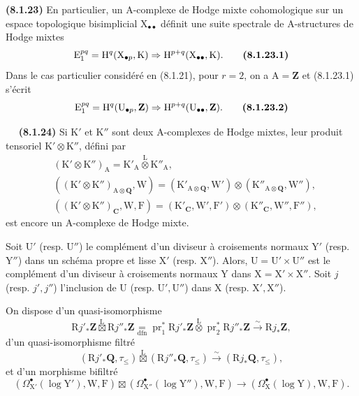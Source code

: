 \documentclass[11pt,leqno]{article}
\newcommand{\Page}[1]{\ifvmode\noindent\else\unskip\ \fi{\footnotesize\textcolor{gray}{[p.\,#1]}}\ \ignorespaces}
\begin{document}
\textbf{(8.1.23)} En particulier, un \(\mathrm{A}\)-complexe de Hodge mixte cohomologique sur un espace topologique bisimplicial \(\mathrm{X}_{\bullet\bullet}\) définit une suite spectrale de \(\mathrm{A}\)-structures de Hodge mixtes
\[
\mathrm{E}_{1}^{pq}
=
\mathrm{H}^{q}(\mathrm{X}_{\bullet p},\mathrm{K})
\Rightarrow
\mathrm{H}^{p+q}(\mathrm{X}_{\bullet\bullet},\mathrm{K}).
\tag*{\textbf{(8.1.23.1)}}
\]
Dans le cas particulier considéré en (8.1.21), pour \(r=2\), on a \(\mathrm{A}=\mathbf{Z}\) et (8.1.23.1) s’écrit
\[
\mathrm{E}_{1}^{pq}
=
\mathrm{H}^{q}(\mathrm{U}_{\bullet p},\mathbf{Z})
\Rightarrow
\mathrm{H}^{p+q}(\mathrm{U}_{\bullet\bullet},\mathbf{Z}).
\tag*{\textbf{(8.1.23.2)}}
\]

\Page{37}
\textbf{(8.1.24)} Si \(\mathrm{K}'\) et \(\mathrm{K}''\) sont deux \(\mathrm{A}\)-complexes de Hodge mixtes, leur produit tensoriel \(\mathrm{K}'\otimes\mathrm{K}''\), défini par
\[
\begin{aligned}
&(\mathrm{K}'\otimes\mathrm{K}'')_{\mathrm{A}}
 =\mathrm{K}'_{\mathrm{A}}\overset{\mathrm{L}}{\otimes}\mathrm{K}''_{\mathrm{A}},\\
&((\mathrm{K}'\otimes\mathrm{K}'')_{\mathrm{A}\otimes\mathbf{Q}},\mathrm{W})
 =(\mathrm{K}'_{\mathrm{A}\otimes\mathbf{Q}},\mathrm{W}')
 \otimes(\mathrm{K}''_{\mathrm{A}\otimes\mathbf{Q}},\mathrm{W}''),\\
&((\mathrm{K}'\otimes\mathrm{K}'')_{\mathbf{C}},\mathrm{W},\mathrm{F})
 =(\mathrm{K}'_{\mathbf{C}},\mathrm{W}',\mathrm{F}')
 \otimes(\mathrm{K}''_{\mathbf{C}},\mathrm{W}'',\mathrm{F}''),
\end{aligned}
\]
est encore un \(\mathrm{A}\)-complexe de Hodge mixte.

Soit \(\mathrm{U}'\) (resp. \(\mathrm{U}''\)) le complément d’un diviseur à croisements normaux \(\mathrm{Y}'\) (resp. \(\mathrm{Y}''\)) dans un schéma propre et lisse \(\mathrm{X}'\) (resp. \(\mathrm{X}''\)). Alors, \(\mathrm{U}=\mathrm{U}'\times\mathrm{U}''\) est le complément d’un diviseur à croisements normaux \(\mathrm{Y}\) dans \(\mathrm{X}=\mathrm{X}'\times\mathrm{X}''\). Soit \(j\) (resp. \(j',j''\)) l’inclusion de \(\mathrm{U}\) (resp. \(\mathrm{U}',\mathrm{U}''\)) dans \(\mathrm{X}\) (resp. \(\mathrm{X}',\mathrm{X}''\)).

On dispose d’un quasi-isomorphisme
\[
\mathrm{R}j'_*\mathbf{Z}\overset{\mathrm{L}}{\boxtimes}\mathrm{R}j''_*\mathbf{Z}
\underset{\mathrm{dfn}}{=}
\operatorname{pr}_1^*\mathrm{R}j'_*\mathbf{Z}
\overset{\mathrm{L}}{\otimes}
\operatorname{pr}_2^*\mathrm{R}j''_*\mathbf{Z}
\xrightarrow{\sim}\mathrm{R}j_*\mathbf{Z},
\]
d’un quasi-isomorphisme filtré
\[
(\mathrm{R}j'_*\mathbf{Q},\tau_{\leq})
\overset{\mathrm{L}}{\boxtimes}
(\mathrm{R}j''_*\mathbf{Q},\tau_{\leq})
\xrightarrow{\sim}
(\mathrm{R}j_*\mathbf{Q},\tau_{\leq}),
\]
et d’un morphisme bifiltré
\[
(\Omega_{\mathrm{X}'}^\bullet(\log\mathrm{Y}'),\mathrm{W},\mathrm{F})
\boxtimes
(\Omega_{\mathrm{X}''}^\bullet(\log\mathrm{Y}''),\mathrm{W},\mathrm{F})
\longrightarrow
(\Omega_{\mathrm{X}}^\bullet(\log\mathrm{Y}),\mathrm{W},\mathrm{F}).
\]
\end{document}

